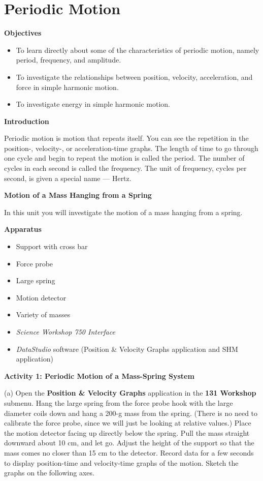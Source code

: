 \section{Periodic Motion}

\makelabheader %

{\bf Objectives }

\begin{itemize}
\item To learn directly about some of the characteristics of periodic motion, namely period, frequency, and amplitude. 
\item To investigate the relationships between position, velocity, acceleration, and force in simple harmonic motion. 
\item To investigate energy in simple harmonic motion.
\end{itemize}
\textbf{Introduction }

Periodic motion is motion that repeats itself. You can see the repetition in
the position-, velocity-, or acceleration-time graphs. The length of time to
go through one cycle and begin to repeat the motion is called the period. The
number of cycles in each second is called the frequency. The unit of frequency,
cycles per second, is given a special name --- Hertz.

\textbf{Motion of a Mass Hanging from a Spring} 

In this unit you will investigate the motion of a mass hanging from a spring.

\textbf{Apparatus} 

\begin{itemize}
\item Support with cross bar
\item Force probe
\item Large spring
\item Motion detector 
\item Variety of masses 
\item \textit{Science Workshop 750 Interface}
\item \textit{DataStudio} software (Position \& Velocity Graphs application and SHM
application)
\end{itemize}
\textbf{Activity 1: Periodic Motion of a Mass-Spring System} 

(a) Open the \textbf{Position \& Velocity Graphs} application in the \textbf{131 Workshop} submenu. Hang the large spring from the force probe hook with the large diameter coils down and hang a 200-g mass from the spring. (There is no need to calibrate the force probe, since we will just be looking at relative values.) Place the motion detector facing up directly below the spring. Pull the mass straight downward about 10 cm, and let go. 
Adjust the height of the support so that the mass comes no closer than 15 cm 
to the detector. Record data for a few seconds to display position-time and 
velocity-time graphs of the motion. Sketch the graphs on the following axes.

